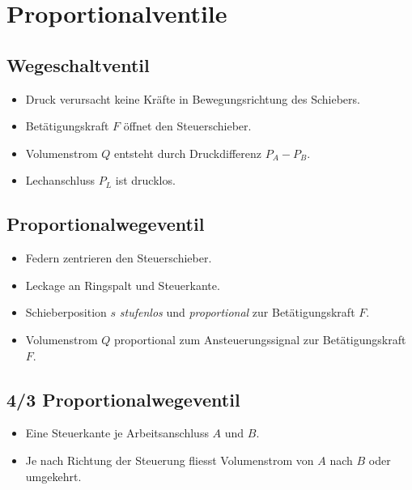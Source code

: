 \section{Proportionalventile}
\subsection{Wegeschaltventil}

\begin{itemize}
\item Druck verursacht keine Kräfte in Bewegungsrichtung des Schiebers.
\item Betätigungskraft $F$ öffnet den Steuerschieber.
\item Volumenstrom $Q$ entsteht durch Druckdifferenz $P_A - P_B$.
\item Lechanschluss $P_L$ ist drucklos. 
\end{itemize}



\subsection{Proportionalwegeventil}
\begin{itemize}
\item Federn zentrieren den Steuerschieber.
\item Leckage an Ringspalt und Steuerkante.
\item Schieberposition $s$ \emph{stufenlos} und \emph{proportional} zur Betätigungskraft $F$.
\item Volumenstrom $Q$ proportional zum Ansteuerungssignal zur Betätigungskraft $F$. 
\end{itemize}



\subsection{4/3 Proportionalwegeventil}
\begin{itemize}
\item Eine Steuerkante je Arbeitsanschluss $A$ und $B$. 
\item Je nach Richtung der Steuerung fliesst Volumenstrom von $A$ nach $B$ oder umgekehrt. 
\end{itemize}


\vfill
\newpage
